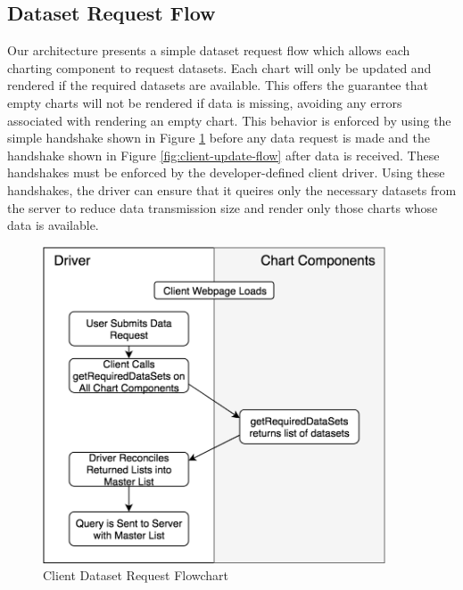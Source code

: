 \subsection{Dataset Request Flow}

Our architecture presents a simple dataset request flow which allows each charting component to request datasets.  Each chart will only be updated and rendered if the required datasets are available.  This offers the guarantee that empty charts will not be rendered if data is missing, avoiding any errors associated with rendering an empty chart.  This behavior is enforced by using the simple handshake shown in Figure \ref{fig:client-dataset-request} before any data request is made and the handshake shown in Figure \ref{fig:client-update-flow} after data is received.  These handshakes must be enforced by the developer-defined client driver.  Using these handshakes, the driver can ensure that it queires only the necessary datasets from the server to reduce data transmission size and render only those charts whose data is available. \par
\begin{figure}
  \centering
  \includegraphics[width=4in]{images/ClientDatasetRequestFlow.png}
  \caption{Client Dataset Request Flowchart}
  \label{fig:client-dataset-request}
\end{figure}


